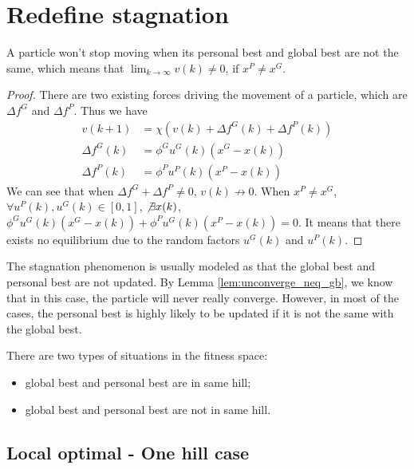 \section{Redefine stagnation}

\begin{lemma}
\label{lem:unconverge_neq_gb}
A particle won't stop moving when its personal best and global best are not the same, 
which means that 
$ \lim_{k \rightarrow \infty} v(k) \neq 0 $, if $ x^{P} \neq x^{G} $.
\begin{proof} 
There are two existing forces driving the movement of a particle, which are $ \Delta f^{G} $ and $ \Delta f^{P} $.
Thus we have
\begin{equation}
\begin{array}{lcl}
v(k+1) & = \chi ( v(k) + \Delta f^{G} (k) + \Delta f^{P} (k) ) \\
\Delta f^{G} (k) & = \phi^{G} u^{G} (k) (x^{G} - x(k)) \\
\Delta f^{P} (k) & = \phi^{P} u^{P} (k) (x^{P} - x(k)) 
\end{array}
\end{equation}
We can see that when $ \Delta f^{G} + \Delta f^{P} \neq 0 $, $ v(k)  \not \rightarrow 0 $.
When $ x^{P} \neq x^{G} $, $ \forall u^{P}(k), u^{G}(k) \in [0, 1] $, $ \not \exists x(k) $, $ \phi^{G} u^{G} (k) (x^{G} - x(k)) + \phi^{P} u^{G} (k) (x^{P} - x(k)) = 0 $.
It means that there exists no equilibrium due to the random factors $ u^{G} (k) $ and $ u^{P} (k) $. 
\end{proof}
\end{lemma}

The stagnation phenomenon is usually modeled as that the global best and personal best are not updated.
By Lemma \ref{lem:unconverge_neq_gb}, we know that in this case, the particle will never really converge.
However, in most of the cases, the personal best is highly likely to be updated if it is not the same with the global best.

There are two types of situations in the fitness space:
\begin{itemize}
\item global best and personal best are in same hill;
\item global best and personal best are not in same hill.
\end{itemize}

\subsection{Local optimal - One hill case}

